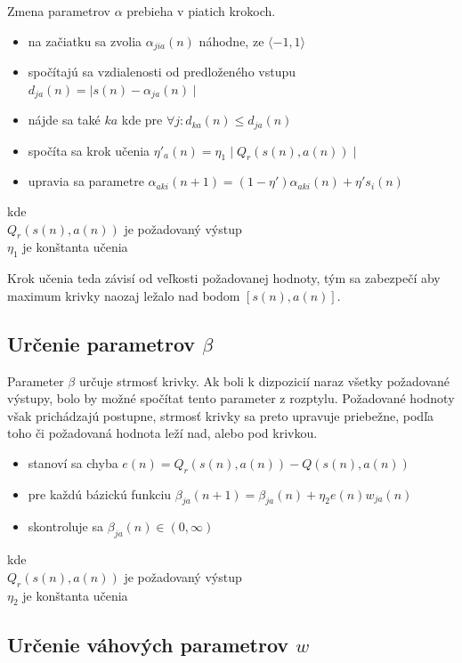 Zmena parametrov $\alpha$ prebieha v piatich krokoch.

\begin{itemize}
  \item na začiatku sa zvolia $\alpha_{jia}(n)$ náhodne, ze $\langle -1, 1 \rangle$
  \item spočítajú sa vzdialenosti od predloženého vstupu $d_{ja}(n) = \mid s(n) - \alpha_{ja}(n) \mid$
  \item nájde sa také $ka$ kde pre $\forall{j} : d_{ka}(n) \leq d_{ja}(n)$
  \item spočíta sa krok učenia $\eta'_a(n) = \eta_1 \mid Q_r(s(n), a(n)) \mid$
  \item upravia sa parametre $\alpha_{aki}(n+1) = (1 - \eta')\alpha_{aki}(n) + \eta' s_{i}(n)$
\end{itemize}
kde \\
$Q_r(s(n), a(n))$ je požadovaný výstup \\
$\eta_1$ je konštanta učenia

Krok učenia teda závisí od veľkosti požadovanej hodnoty, tým sa zabezpečí aby maximum
krivky naozaj ležalo nad bodom $[s(n),a(n)]$.

\subsection{Určenie parametrov $\beta$}

Parameter $\beta$ určuje strmosť krivky. Ak boli k dizpozicií naraz všetky
požadované výstupy, bolo by možné spočítat tento parameter z rozptylu.
Požadované hodnoty však prichádzajú postupne, strmosť krivky sa preto upravuje priebežne,
podľa toho či požadovaná hodnota leží nad, alebo pod krivkou.

\begin{itemize}
\item stanoví sa chyba $e(n) = Q_r(s(n), a(n)) - Q(s(n), a(n))$
\item pre každú bázickú funkciu  $\beta_{ja}(n+1)= \beta_{ja}(n) + \eta_2 e(n)w_{ja}(n)$
\item skontroluje sa $\beta_{ja}(n) \in (0, \infty)$
\end{itemize}

kde \\
$Q_r(s(n), a(n))$ je požadovaný výstup \\
$\eta_2$ je konštanta učenia \\


\subsection{Určenie váhových parametrov $w$}

